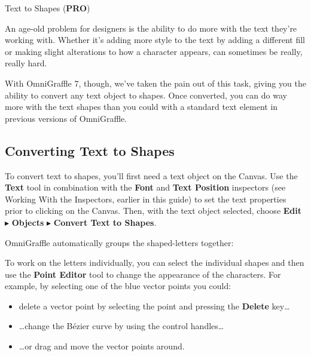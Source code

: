 \documentclass[../main.tex]{subfiles}
\begin{document}
\begin{ogsidebar}
  Text to Shapes (\textbf{PRO})

  An age-old problem for designers is the ability to do more with the text they're working with.
  Whether it's adding more style to the text by adding a different fill or making slight
  alterations to how a character appears, can sometimes be really, really hard.

  With OmniGraffle 7, though, we've taken the pain out of this task, giving you the ability to
  convert any text object to shapes. Once converted, you can do way more with the text shapes
  than you could with a standard text element in previous versions of OmniGraffle.

  \subsection{Converting Text to Shapes}

  To convert text to shapes, you'll first need a text object on the Canvas. Use the
  \textbf{Text} tool in combination with the \textbf{Font} and \textbf{Text Position}
  inspectors (see Working With the Inspectors, earlier in this guide) to set the text
  properties prior to clicking on the Canvas. Then, with the text object selected, choose
  \textbf{Edit} $\blacktriangleright$ \textbf{Objects} $\blacktriangleright$ \textbf{Convert
  Text to Shapes}.


  OmniGraffle automatically groups the shaped-letters together:


  To work on the letters individually, you can select the individual shapes and then use the
  \textbf{Point Editor} tool to change the appearance of the characters. For example, by
  selecting one of the blue vector points you could:

  \begin{itemize}
    \item delete a vector point by selecting the point and pressing the \textbf{Delete}
      key\ldots{}

    \item \ldots{}change the Bézier curve by using the control handles\ldots{}

    \item \ldots{}or drag and move the vector points around.


\end{itemize}
\end{ogsidebar}
\end{document}
